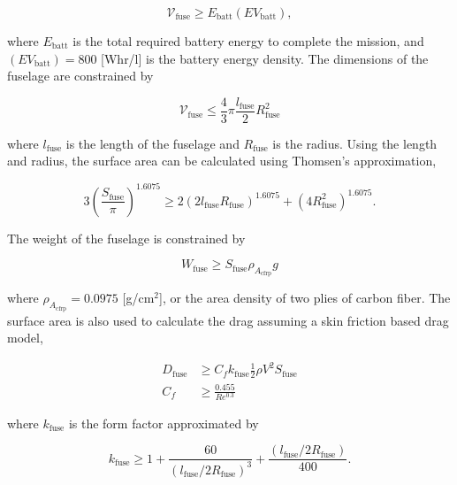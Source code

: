 \documentclass[]{aiaa-tc}%
\begin{document}
\begin{equation}
    \label{e:fusevol}
    \mathcal{V}_{\text{fuse}} \geq E_{\mathrm{batt}} (EV_{\mathrm{batt}}), 
\end{equation}

where $E_{\mathrm{batt}}$ is the total required battery energy to complete the mission, and $(EV_{\mathrm{batt}}) = 800 $ [Whr/l] is the battery energy density. 
The dimensions of the fuselage are constrained by

\begin{equation}
    \label{e:fusevol2}
    \mathcal{V}_{\text{fuse}} \leq \frac{4}{3}\pi \frac{l_{\text{fuse}}}{2}R_{\text{fuse}}^2
\end{equation}

where $l_{\text{fuse}}$ is the length of the fuselage and $R_{\text{fuse}}$ is the radius. Using the length and radius, the surface area can be calculated using Thomsen's approximation,\cite{ellipsoidSA}

\begin{equation}
    \label{e:fusesa}
    3 \left( \frac{S_{\text{fuse}}}{\pi} \right)^{1.6075} \geq 2(2l_{\text{fuse}}R_{\text{fuse}})^{1.6075} + (4R_{\text{fuse}}^2)^{1.6075}.
\end{equation}

The weight of the fuselage is constrained by

\begin{equation}
    \label{e:fuseweight}
    W_{\text{fuse}} \geq S_{\text{fuse}} \rho_{A_{\text{cfrp}}} g
\end{equation} 

where $\rho_{A_{\text{cfrp}}} = 0.0975$ [g/cm$^2$], or the area density of two plies of carbon fiber.\cite{cfply}  The surface area is also used to calculate the drag assuming a skin friction based drag model,

\begin{align}
    \label{e:fusedrag}
    D_{\text{fuse}} &\geq C_f k_{\text{fuse}} \frac{1}{2} \rho V^2 S_{\text{fuse}} \\
    C_f &\geq \frac{0.455}{Re^{0.3}}
\end{align}

where $k_{\text{fuse}}$ is the form factor approximated by\cite{raymer}

\begin{equation}
    \label{e:fuseform}
    k_{\text{fuse}} \geq 1 + \frac{60}{(l_{\text{fuse}}/2R_{\text{fuse}})^3} + \frac{(l_{\text{fuse}}/2R_{\text{fuse}})}{400}.
\end{equation}
\end{document}
